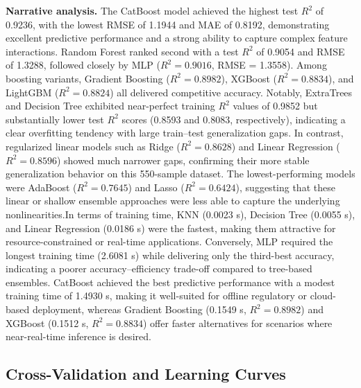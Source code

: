 \textbf{Narrative analysis.} The CatBoost model achieved the highest test \(R^2\) of 0.9236, with the lowest RMSE of 1.1944 and MAE of 0.8192, demonstrating excellent predictive performance and a strong ability to capture complex feature interactions. Random Forest ranked second with a test \(R^2\) of 0.9054 and RMSE of 1.3288, followed closely by MLP (\(R^2 = 0.9016\), RMSE = 1.3558). Among boosting variants, Gradient Boosting (\(R^2 = 0.8982\)), XGBoost (\(R^2 = 0.8834\)), and LightGBM (\(R^2 = 0.8824\)) all delivered competitive accuracy.
Notably, ExtraTrees and Decision Tree exhibited near-perfect training \(R^2\) values of 0.9852 but substantially lower test \(R^2\) scores (0.8593 and 0.8083, respectively), indicating a clear overfitting tendency with large train–test generalization gaps. In contrast, regularized linear models such as Ridge (\(R^2 = 0.8628\)) and Linear Regression (\(R^2 = 0.8596\)) showed much narrower gaps, confirming their more stable generalization behavior on this 550-sample dataset. The lowest-performing models were AdaBoost (\(R^2 = 0.7645\)) and Lasso (\(R^2 = 0.6424\)), suggesting that these linear or shallow ensemble approaches were less able to capture the underlying nonlinearities.In terms of training time, KNN (0.0023 s), Decision Tree (0.0055 s), and Linear Regression (0.0186 s) were the fastest, making them attractive for resource-constrained or real-time applications. Conversely, MLP required the longest training time (2.6081 s) while delivering only the third-best accuracy, indicating a poorer accuracy–efficiency trade-off compared to tree-based ensembles. CatBoost achieved the best predictive performance with a modest training time of 1.4930 s, making it well-suited for offline regulatory or cloud-based deployment, whereas Gradient Boosting (0.1549 s, \(R^2 = 0.8982\)) and XGBoost (0.1512 s, \(R^2 = 0.8834\)) offer faster alternatives for scenarios where near-real-time inference is desired.

\subsection{Cross-Validation and Learning Curves}

